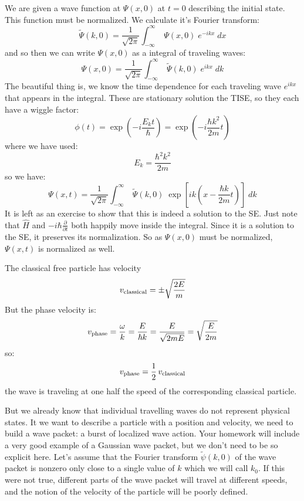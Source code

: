 \documentclass[12pt]{book}
\begin{document}
We are given a wave function at $\Psi(x,0)$ at $t=0$ describing the
initial state.  This function must be normalized.  We calculate it's
Fourier transform:
$$ \widetilde{\Psi}(k,0) = \frac{1}{\sqrt{2\pi}} \int_{-\infty}^{\infty} \; \Psi(x,0) \; e^{-ikx} \; dx $$
and so then we can write $\Psi(x,0)$ as a integral of traveling waves:
$$ \Psi(x,0) = \frac{1}{\sqrt{2\pi}} \int_{-\infty}^{\infty} \; \widetilde{\Psi}(k,0) \; e^{ikx} \; dk $$
The beautiful thing is, we know the time dependence for each traveling wave $e^{ikx}$ that appears in the integral.  These are stationary solution the TISE, so they each have a wiggle factor:
$$\phi(t) = \exp\left(-i\frac{E_k t}{\hbar}\right) = \exp\left(-i\frac{\hbar k^2}{2m}t\right)$$
where we have used:
$$E_k = \frac{\hbar^2 k^2}{2m}$$
so we have:
$$ \Psi(x,t) = \frac{1}{\sqrt{2\pi}} \int_{-\infty}^{\infty} \; \widetilde{\Psi}(k,0) \; 
\exp\left[ik\left(x-\frac{\hbar k}{2m}t\right)\right]\; dk $$
It is left as an exercise to show that this is indeed a solution to the SE.  Just note that $\hat{H}$
and $-i\hbar \frac{\partial}{\partial t}$ both happily move inside the integral.  Since it is a solution to the SE, it preserves its normalization. So as $\Psi(x,0)$ must be normalized, $\Psi(x,t)$ is normalized as well.

The classical free particle has velocity
$$v_{\rm classical} = \pm\sqrt{\frac{2E}{m}}$$
But the phase velocity is:
$$v_{\rm phase} = \frac{\omega}{k} = \frac{E}{\hbar k} = \frac{E}{\sqrt{2mE}} = \sqrt{\frac{E}{2m}}$$
so:
$$v_{\rm phase} = \frac{1}{2} \, v_{\rm classical} $$
the wave is traveling at one half the speed of the corresponding classical particle.

But we already know that individual travelling waves do not represent
physical states.  It we want to describe a particle with a position
and velocity, we need to build a wave packet: a burst of localized
wave action.  Your homework will include a very good example of a
Gaussian wave packet, but we don't need to be so explicit here.  Let's
assume that the Fourier transform $\widetilde{\psi}(k,0)$ of the wave
packet is nonzero only close to a single value of $k$ which we will
call $k_0$.  If this were not true, different parts of the wave packet
will travel at different speeds, and the notion of the velocity of the
particle will be poorly defined.
\end{document}
